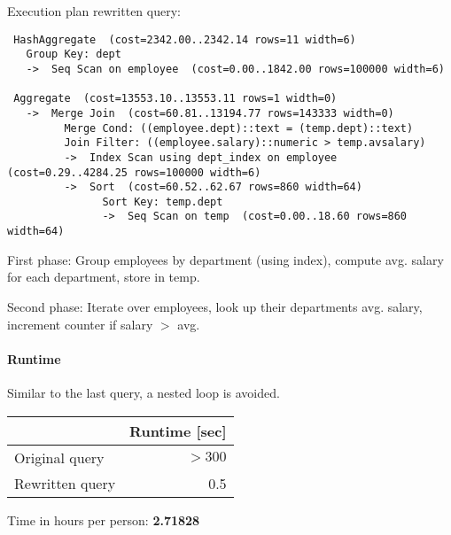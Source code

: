 \documentclass[11pt]{scrartcl}
\begin{document}
Execution plan rewritten query:

\begin{verbatim}
 HashAggregate  (cost=2342.00..2342.14 rows=11 width=6)
   Group Key: dept
   ->  Seq Scan on employee  (cost=0.00..1842.00 rows=100000 width=6)

 Aggregate  (cost=13553.10..13553.11 rows=1 width=0)
   ->  Merge Join  (cost=60.81..13194.77 rows=143333 width=0)
         Merge Cond: ((employee.dept)::text = (temp.dept)::text)
         Join Filter: ((employee.salary)::numeric > temp.avsalary)
         ->  Index Scan using dept_index on employee  (cost=0.29..4284.25 rows=100000 width=6)
         ->  Sort  (cost=60.52..62.67 rows=860 width=64)
               Sort Key: temp.dept
               ->  Seq Scan on temp  (cost=0.00..18.60 rows=860 width=64)
\end{verbatim}

First phase: Group employees by department (using index),
compute avg. salary for each department,
store in temp.

Second phase: Iterate over employees, look up
their departments avg. salary, increment counter if salary $>$ avg.

\paragraph{Runtime} Similar to the last query, a nested loop is avoided.


\begin{table}[H]
  \begin{tabular}{l|r}
    & Runtime [sec] \\
   \hline
    Original query & $>300$\\
    Rewritten query & 0.5\\
  \end{tabular}
\end{table}


  Time in hours per person: {\bf 2.71828}
\end{document}
